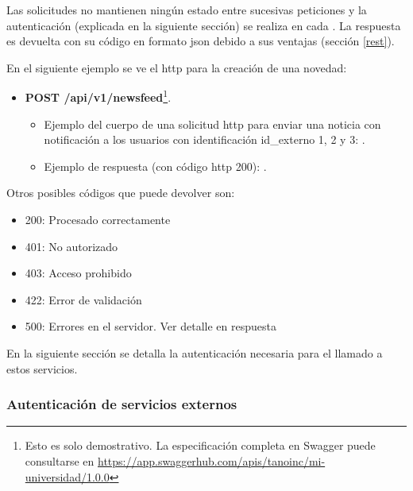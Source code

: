 Las solicitudes no mantienen ningún estado entre sucesivas peticiones y la autenticación (explicada en la siguiente sección) se realiza en cada . La respuesta es devuelta con su código en formato \gls{json} debido a sus ventajas (sección \ref{rest}).

En el siguiente ejemplo se ve el  \gls{http} para la creación de una novedad:
\begin{itemize}
\item \textbf{POST /api/v1/newsfeed}\footnote{Esto es solo demostrativo. La especificación completa en Swagger puede consultarse en \url{https://app.swaggerhub.com/apis/tanoinc/mi-universidad/1.0.0}}.
\begin{itemize}
\item Ejemplo del cuerpo de una solicitud \gls{http} para enviar una noticia con notificación a los usuarios con identificación id\_externo 1, 2 y 3:
\begingroup
  .\label{codigo_post_newsfeed_solicitud}
\endgroup

\item Ejemplo de respuesta (con código \gls{http} 200):
\begingroup
  .\label{codigo_post_newsfeed_respuesta}
\endgroup
\end{itemize}
\end{itemize}

Otros posibles códigos que puede devolver son:
\begin{itemize}
\item 200:
Procesado correctamente
\item 401:
No autorizado
\item 403:
Acceso prohibido
\item 422:
Error de validación
\item 500:
Errores en el servidor. Ver detalle en respuesta
\end{itemize}

En la siguiente sección se detalla la autenticación necesaria para el llamado a estos servicios.

\subsubsection{Autenticación de servicios externos}
\label{autenticacion_servicios_externos}

